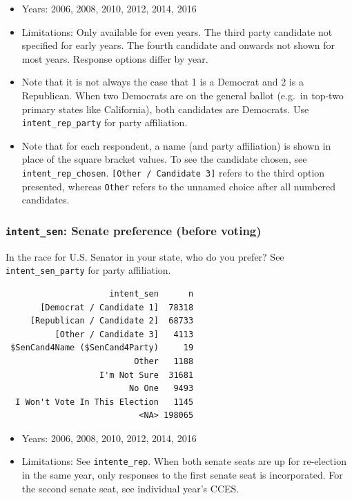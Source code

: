 \documentclass[10pt,article,oneside]{memoir}
\theoremstyle{definition}
\begin{document}
\begin{itemize}
\tightlist
\item
  Years: 2006, 2008, 2010, 2012, 2014, 2016
\item
  Limitations: Only available for even years. The third party candidate
  not specified for early years. The fourth candidate and onwards not
  shown for most years. Response options differ by year.
\item
  Note that it is not always the case that 1 is a Democrat and 2 is a
  Republican. When two Democrats are on the general ballot (e.g.~in
  top-two primary states like California), both candidates are
  Democrats. Use \texttt{intent\_rep\_party} for party affiliation.
\item
  Note that for each respondent, a name (and party affiliation) is shown
  in place of the square bracket values. To see the candidate chosen,
  see \texttt{intent\_rep\_chosen}.
  \texttt{{[}Other\ /\ Candidate\ 3{]}} refers to the third option
  presented, whereas \texttt{Other} refers to the unnamed choice after
  all numbered candidates.
\end{itemize}

\hypertarget{intent_sen-senate-preference-before-voting}{%
\subsubsection{\texorpdfstring{\texttt{intent\_sen}: Senate preference
(before
voting)}{intent\_sen: Senate preference (before voting)}}\label{intent_sen-senate-preference-before-voting}}

In the race for U.S. Senator in your state, who do you prefer? See
\texttt{intent\_sen\_party} for party affiliation.

\begin{verbatim}
                     intent_sen      n
       [Democrat / Candidate 1]  78318
     [Republican / Candidate 2]  68733
          [Other / Candidate 3]   4113
 $SenCand4Name ($SenCand4Party)     19
                          Other   1188
                   I'm Not Sure  31681
                         No One   9493
  I Won't Vote In This Election   1145
                           <NA> 198065
\end{verbatim}

\begin{itemize}
\tightlist
\item
  Years: 2006, 2008, 2010, 2012, 2014, 2016
\item
  Limitations: See \texttt{intente\_rep}. When both senate seats are up
  for re-election in the same year, only responses to the first senate
  seat is incorporated. For the second senate seat, see individual
  year's CCES.
\end{itemize}
\end{document}

